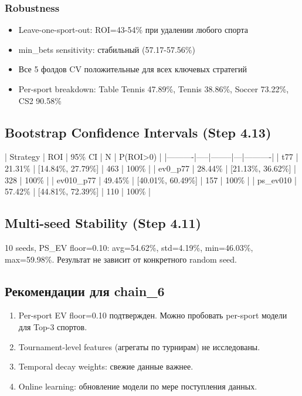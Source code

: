 \documentclass[12pt,a4paper]{article}
\begin{document}
\subsubsection{Robustness}
\begin{itemize}
  \item Leave-one-sport-out: ROI=43-54\% при удалении любого спорта
  \item min\_bets sensitivity: стабильный (57.17-57.56\%)
  \item Все 5 фолдов CV положительные для всех ключевых стратегий
  \item Per-sport breakdown: Table Tennis 47.89\%, Tennis 38.86\%, Soccer 73.22\%, CS2 90.58\%
\end{itemize}

\subsection{Bootstrap Confidence Intervals (Step 4.13)}
| Strategy | ROI | 95\% CI | N | P(ROI>0) |
|----------|-----|--------|---|----------|
| t77 | 21.31\% | [14.84\%, 27.79\%] | 463 | 100\% |
| ev0\_p77 | 28.44\% | [21.13\%, 36.62\%] | 328 | 100\% |
| ev010\_p77 | 49.45\% | [40.01\%, 60.49\%] | 157 | 100\% |
| ps\_ev010 | 57.42\% | [44.81\%, 72.39\%] | 110 | 100\% |

\subsection{Multi-seed Stability (Step 4.11)}
10 seeds, PS\_EV floor=0.10: avg=54.62\%, std=4.19\%, min=46.03\%, max=59.98\%.
Результат не зависит от конкретного random seed.

\subsection{Рекомендации для chain\_6}
\begin{enumerate}
  \item Per-sport EV floor=0.10 подтвержден. Можно пробовать per-sport модели для Top-3 спортов.
  \item Tournament-level features (агрегаты по турнирам) не исследованы.
  \item Temporal decay weights: свежие данные важнее.
  \item Online learning: обновление модели по мере поступления данных.
\end{enumerate}
\end{document}
